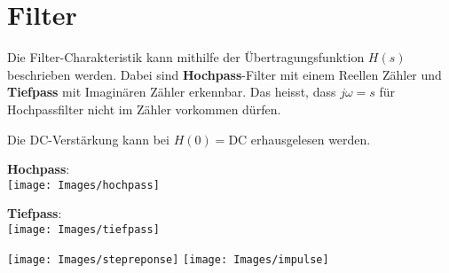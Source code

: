 \section{Filter}
Die Filter-Charakteristik kann mithilfe der Übertragungsfunktion $H(s)$ beschrieben werden. Dabei sind \textbf{Hochpass}-Filter mit einem Reellen Zähler und \textbf{Tiefpass} mit Imaginären Zähler erkennbar. Das heisst, dass $j\omega = s$ für Hochpassfilter nicht im Zähler vorkommen dürfen.

Die DC-Verstärkung kann bei $H(0) = \text{DC}$ erhausgelesen werden. 

\noindent\textbf{Hochpass}:\\
\texttt{[image: Images/hochpass]}

\noindent\textbf{Tiefpass}:\\
\texttt{[image: Images/tiefpass]}


\begin{center}
	\texttt{[image: Images/stepreponse]}
	\texttt{[image: Images/impulse]}
\end{center}
